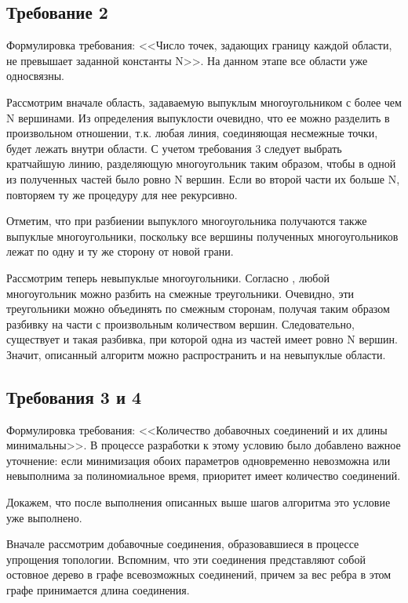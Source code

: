 \subsection{Требование 2}
\label{task2}

Формулировка требования: <<Число точек, задающих границу каждой области, не превышает заданной константы N>>. На данном этапе все области уже односвязны.

Рассмотрим вначале область, задаваемую выпуклым многоугольником с более чем N вершинами. Из определения выпуклости очевидно, что ее можно разделить в произвольном отношении, т.к. любая линия, соединяющая несмежные точки, будет лежать внутри области. С учетом требования 3 следует выбрать кратчайшую линию, разделяющую многоугольник таким образом, чтобы в одной из полученных частей было ровно N вершин. Если во второй части их больше N, повторяем ту же процедуру для нее рекурсивно.

Отметим, что при разбиении выпуклого многоугольника получаются также выпуклые многоугольники, поскольку все вершины полученных многоугольников лежат по одну и ту же сторону от новой грани.

Рассмотрим теперь невыпуклые многоугольники. Согласно \cite{de_berg_chapter_2000}, любой многоугольник можно разбить на смежные треугольники. Очевидно, эти треугольники можно объединять по смежным сторонам, получая таким образом разбивку на части с произвольным количеством вершин. Следовательно, существует и такая разбивка, при которой одна из частей имеет ровно N вершин. Значит, описанный алгоритм можно распространить и на невыпуклые области.

\subsection{Требования 3 и 4}
\label{}

Формулировка требования: <<Количество добавочных соединений и их длины минимальны>>. В процессе разработки к этому условию было добавлено важное уточнение: если минимизация обоих параметров одновременно невозможна или невыполнима за полиномиальное время, приоритет имеет количество соединений.

Докажем, что после выполнения описанных выше шагов алгоритма это условие уже выполнено.

Вначале рассмотрим добавочные соединения, образовавшиеся в процессе упрощения топологии. Вспомним, что эти соединения представляют собой остовное дерево в графе всевозможных соединений, причем за вес ребра в этом графе принимается длина соединения.

